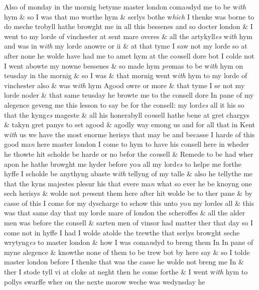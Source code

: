 \documentclass[12pt, a4paper]{book}
\begin{document}
		\ifthenelse{\isodd{\thepage}}
		{\reversemarginpar}
		{\normalmarginpar}
		Also of monday in the mornig betyme master london coma\textit{n}dyd me to be w\textit{ith}
 hym \& so I was that mo worthe hym \& serlys bothe w\textit{hich} I thenke was borne
 to do meche trobyll hathe browght me in all this bessenes and so
 		docter london \& I went to my lorde of vinchester at sent mare overes
 \& all the artykyll\textit{es} w\textit{ith} hym and was in w\textit{ith} my lorde anowre or ii \&
 at that tyme I saw not my lorde so at after none he wolde have had
 me to amet hym at the co\textit{n}sell dore bot I colde not I went abowte my
 nowne bessenes \& so made hym \textit{pro}mas to be w\textit{ith} hym on teusday in the
 		mornig \& so I was \& that mornig went w\textit{ith} hym to my lorde of
 vinchester also \& was w\textit{ith} hym Agood owre or more \& that tyme I
 se not my lorde noder \& that same teusday he browte me to the
 consell dore In pane of my alegence geveng me this lesson to say
 be for the consell: my lord\textit{es} all it his so that the kyng\textit{es} mageste \& all
 his honerabyll co\textit{n}sell hathe bene at gret chargys \& takyn gret panys
 to set agood \& agodly way emong us and for all that in Kent w\textit{ith} us we
 have the most enorme herisys that may be and becasse I harde of this
 good ma\textit{n} here master london I come to hym to have his consell here in
 wheder he thowte hit scholde be harde or no befor the co\textit{n}sell \& Remede
 to be had wher apon he hathe browght me hyder before yo\textit{u} all my lord\textit{es}
 to helpe me forthe hyffe I scholde be anythyng abaste w\textit{ith} tellyng of my talle
 \& also he tellythe me that the kyns majestes plesur his that evere
 ma\textit{n} what so ever he be knoyng one sech herisys \& wolde not p\textit{re}sent
 them here after hit wolde be to ther pane \& by casse of this I come
 for my dyscharge to schow this unto yo\textit{u} my lordes all \& this was
 that same day that my lorde mare of london the scheroffes \& all the
 alder men was before the consell \& sarten men of vinsor had matter
 ther that day so I come not in hyffe I had I wolde atolde the trewthe
 that serlys browght seche wrytyng\textit{es} to master london \& how I was
 coma\textit{n}dyd to breng them In In pane of myne alegence \& knowthe
 		none of them to be trew bot by here say \& so I tolde master london
 before I thenke that was the casse he wolde not breng me In \& ther I stode
 tyll vi at cloke at neght then he come forthe \& I went w\textit{ith} hym to
 pollys swarffe wher on the nexte morow weche was wedynsday he
\end{document}

